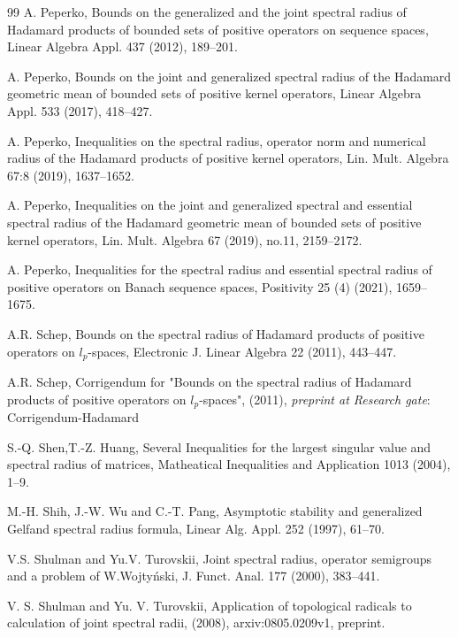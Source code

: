 \documentclass[12pt, reqno]{amsart}
\theoremstyle{definition}
\theoremstyle{remark}
\numberwithin{equation}{section}
\begin{document}
\begin{thebibliography}{99}
 A. Peperko, Bounds on the generalized and the joint spectral radius of Hadamard products of bounded sets of positive operators on sequence
spaces, Linear Algebra  Appl. 437 (2012), 189--201.

 A. Peperko,  Bounds on the joint and generalized spectral radius of the Hadamard geometric mean of bounded sets of positive kernel operators,
Linear Algebra  Appl. 533 (2017), 418--427.

 A. Peperko, Inequalities on the spectral radius, operator norm and numerical radius of the Hadamard products of positive kernel operators,  Lin. Mult. Algebra 67:8 (2019), 1637--1652. %

 A. Peperko, Inequalities on the joint and generalized spectral and essential spectral radius of the Hadamard geometric mean of bounded sets of positive kernel operators,  Lin. Mult. Algebra 67 (2019), no.11, 2159--2172.

 A. Peperko, Inequalities for the spectral radius and essential spectral radius of positive operators on Banach sequence spaces, Positivity 25 (4) (2021), 1659--1675.

 A.R. Schep, Bounds on the spectral radius of Hadamard products of positive operators on $l_p$-spaces,  Electronic J. Linear Algebra 22 
(2011), 443--447.

 A.R. Schep, Corrigendum for "Bounds on the spectral radius of Hadamard products of positive operators on $l_p$-spaces", (2011), {\it preprint
at Research gate}: Corrigendum-Hadamard    

 S.-Q. Shen,T.-Z. Huang, Several Inequalities for the largest singular value and spectral radius of matrices, Matheatical Inequalities  and Application 1013 (2004), 1--9.



 M.-H. Shih, J.-W. Wu and C.-T. Pang, Asymptotic stability and generalized Gelfand
spectral radius formula,  Linear Alg. Appl. 252 (1997), 61--70.

 V.S. Shulman and Yu.V. Turovskii, Joint spectral radius,
operator semigroups and a problem of W.Wojty\'{n}ski,  J. Funct. Anal.
177 (2000), 383--441.

 V. S. Shulman and Yu. V. Turovskii, Application of topological radicals to calculation of joint spectral radii, (2008), arxiv:0805.0209v1, preprint. %


\end{thebibliography}
\end{document}
